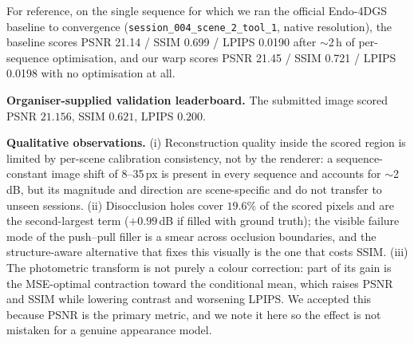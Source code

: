 For reference, on the single sequence for which we ran the official Endo-4DGS baseline to convergence
(\texttt{session\_004\_scene\_2\_tool\_1}, native resolution), the baseline scores PSNR 21.14 / SSIM 0.699
/ LPIPS 0.0190 after $\sim$2\,h of per-sequence optimisation, and our warp scores PSNR 21.45 / SSIM 0.721
/ LPIPS 0.0198 with no optimisation at all.

\textbf{Organiser-supplied validation leaderboard.} The submitted image scored PSNR $21.156$,
SSIM $0.621$, LPIPS $0.200$.

\textbf{Qualitative observations.} (i) Reconstruction quality inside the scored region is limited by
per-scene calibration consistency, not by the renderer: a sequence-constant image shift of 8--35\,px is
present in every sequence and accounts for $\sim$2\,dB, but its magnitude and direction are scene-specific
and do not transfer to unseen sessions. (ii) Disocclusion holes cover $19.6\%$ of the scored pixels and
are the second-largest term ($+0.99$\,dB if filled with ground truth); the visible failure mode of the
push--pull filler is a smear across occlusion boundaries, and the structure-aware alternative that fixes
this visually is the one that costs SSIM. (iii) The photometric transform is not purely a colour
correction: part of its gain is the MSE-optimal contraction toward the conditional mean, which raises PSNR
and SSIM while lowering contrast and worsening LPIPS. We accepted this because PSNR is the primary metric,
and we note it here so the effect is not mistaken for a genuine appearance model.

%






